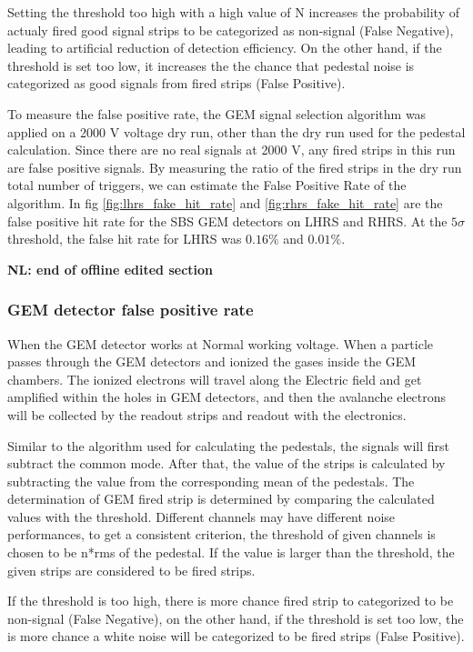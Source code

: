 Setting the threshold   too high with a high value of N increases the probability of  actualy  fired 
good signal  strips to  be categorized as  non-signal  (False Negative), leading to artificial reduction 
of detection efficiency.  On the other hand, if the threshold is set too low, it increases the the 
 chance that pedestal  noise is categorized as good signals from fired strips (False Positive). 

To measure the false positive rate, the GEM signal selection algorithm was applied on a 2000 V voltage 
dry run, other than the dry run used for the pedestal calculation. Since there are no real signals  at 
2000 V,  any fired strips in this run are false positive signals. By measuring the ratio of the fired 
strips in the dry run total number of triggers, we can estimate the False Positive Rate of the algorithm. 
In fig \ref{fig:lhrs_fake_hit_rate} and \ref{fig:rhrs_fake_hit_rate} are the false positive  hit rate 
for the SBS GEM detectors on LHRS and RHRS. At the $5\sigma$ threshold, the false hit rate for LHRS 
was $0.16\%$ and $0.01\%$.

{\bf NL: end of offline edited section}

\subsubsection{GEM detector false positive rate}

When the GEM detector works at Normal working voltage. When a particle passes through  the GEM detectors and ionized the gases inside the GEM chambers. The ionized electrons will travel along the Electric field and get amplified within the holes in GEM detectors, and then the avalanche electrons will be collected by the readout strips and readout with the electronics. 

Similar to the algorithm used for calculating the pedestals, the signals will first subtract the common mode. After that, the value of the strips is calculated by subtracting the value from the corresponding mean of the pedestals. The determination of GEM fired strip is determined by comparing the calculated values with the threshold. Different channels may have different noise performances, to get a consistent criterion, the threshold of given channels is chosen to be n*rms of the pedestal. If the value is larger than the threshold, the given strips are considered to be fired strips. 

If the threshold is too high, there is more chance fired strip to categorized to be non-signal (False Negative), on the other hand, if the threshold is set too low, the is more chance a white noise will be categorized to be fired strips (False Positive). 

